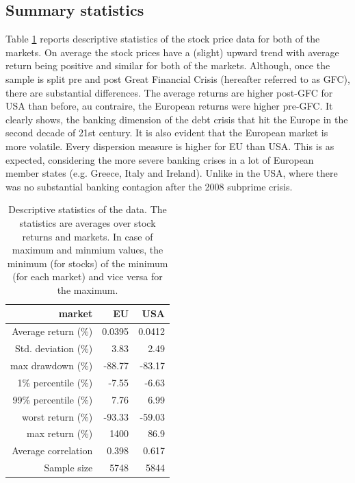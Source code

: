 \documentclass[12pt]{article}
\begin{document}
\subsection{Summary statistics}\label{subsection:data_descrptive}

Table \ref{table:descriptive} reports descriptive statistics of the stock price data for both of the markets. On average the stock prices have a (slight) upward trend with average return being positive and similar for both of the markets. Although, once the sample is split pre and post Great Financial Crisis (hereafter referred to as GFC), there are substantial differences. The average returns are higher post-GFC for USA than before, au contraire, the European returns were higher pre-GFC. It clearly shows, the banking dimension of the debt crisis that hit the Europe in the second decade of 21st century. It is also evident that the European market is more volatile. Every dispersion measure is higher for EU than USA. This is as expected, considering the more severe banking crises in a lot of European member states (e.g. Greece, Italy and Ireland). Unlike in the USA, where there was no substantial banking contagion after the 2008 subprime crisis. 

\begin{table}[h]
	\centering
	\begin{tabular}{r|r|r}
		market & EU & USA \\ 
		\hline \hline
		Average return (\%)& 0.0395 & 0.0412 \\ 
		Std. deviation (\%)& 3.83 & 2.49 \\ 
		max drawdown (\%)& -88.77 & -83.17 \\
		1\% percentile (\%)& -7.55 & -6.63 \\ 
		99\% percentile (\%)& 7.76 & 6.99 \\ 
		worst return (\%)& -93.33 & -59.03 \\ 
		max return (\%)& 1400 &   86.9 \\ 
		Average correlation & 0.398 & 0.617 \\
		Sample size & 5748 & 5844 \\ 
	\end{tabular}
	\caption{Descriptive statistics of the data. The statistics are averages over stock returns and markets. In case of maximum and minmium values, the minimum (for stocks) of the minimum (for each market) and vice versa for the maximum.}
	\label{table:descriptive}
\end{table}
\end{document}
